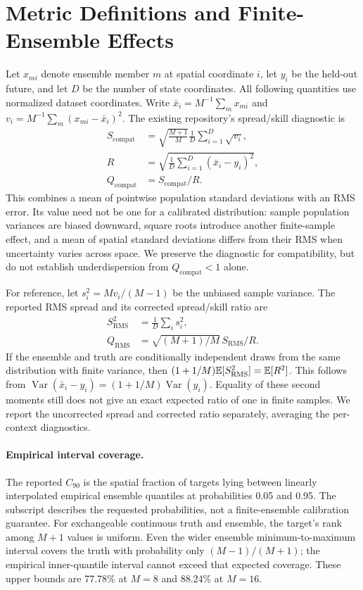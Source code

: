 \section{Metric Definitions and Finite-Ensemble Effects}\label{app:metrics}
Let $x_{mi}$ denote ensemble member $m$ at spatial coordinate $i$, let $y_i$ be the held-out future, and let $D$ be the number of state coordinates. All following quantities use normalized dataset coordinates. Write $\bar x_i=M^{-1}\sum_m x_{mi}$ and $v_i=M^{-1}\sum_m(x_{mi}-\bar x_i)^2$. The existing repository's spread/skill diagnostic is
\begin{align}
 S_{\mathrm{compat}}&=\sqrt{\frac{M+1}{M}}
 \frac1D\sum_{i=1}^D\sqrt{v_i},\\
 R&=\sqrt{\frac1D\sum_{i=1}^D(\bar x_i-y_i)^2},\\
 Q_{\mathrm{compat}}&=S_{\mathrm{compat}}/R.
\end{align}
This combines a mean of pointwise population standard deviations with an RMS error. Its value need not be one for a calibrated distribution: sample population variances are biased downward, square roots introduce another finite-sample effect, and a mean of spatial standard deviations differs from their RMS when uncertainty varies across space. We preserve the diagnostic for compatibility, but do not establish underdispersion from $Q_{\mathrm{compat}}<1$ alone.

For reference, let $s_i^2=Mv_i/(M-1)$ be the unbiased sample variance. The reported RMS spread and its corrected spread/skill ratio are
\begin{align}
 S_{\mathrm{RMS}}^2&=\frac1D\sum_i s_i^2,\\
 Q_{\mathrm{RMS}}&=\sqrt{(M+1)/M}\,S_{\mathrm{RMS}}/R.
\end{align}
If the ensemble and truth are conditionally independent draws from the same distribution with finite variance, then $(1+1/M)\mathbb{E}[S_{\mathrm{RMS}}^2]=\mathbb{E}[R^2]$. This follows from $\operatorname{Var}(\bar x_i-y_i)=(1+1/M)\operatorname{Var}(y_i)$. Equality of these second moments still does not give an exact expected ratio of one in finite samples. We report the uncorrected spread and corrected ratio separately, averaging the per-context diagnostics.

\paragraph{Empirical interval coverage.} The reported $C_{90}$ is the spatial fraction of targets lying between linearly interpolated empirical ensemble quantiles at probabilities 0.05 and 0.95. The subscript describes the requested probabilities, not a finite-ensemble calibration guarantee. For exchangeable continuous truth and ensemble, the target's rank among $M+1$ values is uniform. Even the wider ensemble minimum-to-maximum interval covers the truth with probability only $(M-1)/(M+1)$; the empirical inner-quantile interval cannot exceed that expected coverage. These upper bounds are 77.78\% at $M=8$ and 88.24\% at $M=16$.

